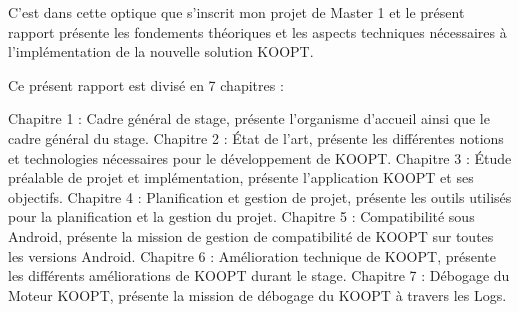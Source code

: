 C’est dans cette optique que s’inscrit mon projet de Master 1 et le présent rapport présente les fondements théoriques et les aspects techniques nécessaires à l’implémentation de la  nouvelle solution KOOPT.
		
Ce présent rapport est divisé en 7 chapitres :
 
Chapitre 1 : Cadre général de stage, présente l’organisme d’accueil ainsi que  le cadre général du stage.
\newline
Chapitre 2 : État de l’art, présente les différentes notions et technologies nécessaires pour le développement de KOOPT.
\newline
Chapitre 3 : Étude préalable de projet et implémentation, présente l’application KOOPT et ses objectifs.
\newline
Chapitre 4 : Planification et gestion de projet, présente les outils utilisés pour la planification et la gestion du projet.
\newline
Chapitre 5 : Compatibilité sous Android, présente la mission de gestion de compatibilité de KOOPT sur toutes les versions Android.
\newline
Chapitre 6 : Amélioration technique de KOOPT, présente les  différents améliorations de KOOPT durant le stage. 
\newline
Chapitre 7 : Débogage du Moteur KOOPT, présente la mission de débogage du KOOPT à travers les Logs.


